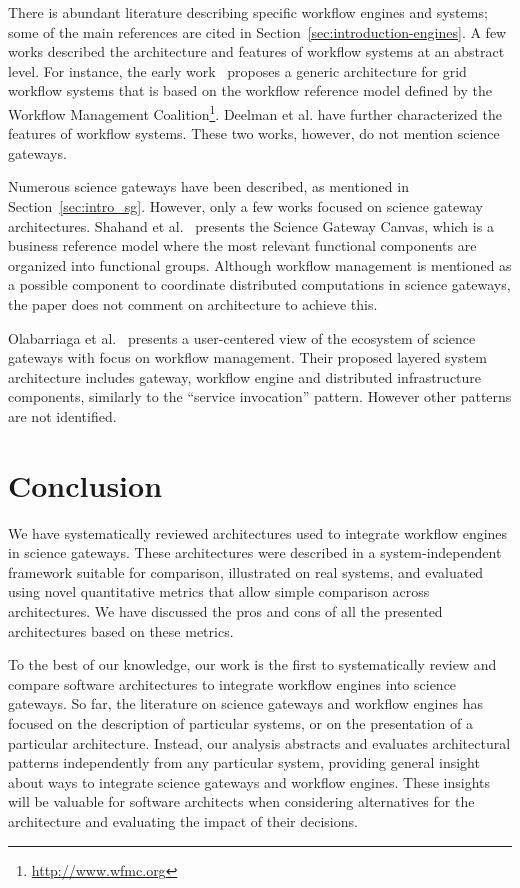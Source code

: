 \documentclass[preprint,3p,twocolumn]{elsarticle}
\begin{document}
There is abundant literature describing specific workflow engines and
systems; some of the main references are cited in
Section~\ref{sec:introduction-engines}. A few works described the
architecture and features of workflow systems at an abstract level. For
instance, the early work~\cite{yuTaxonomy} proposes a generic
architecture for grid workflow systems that is based on the workflow
reference model defined by the Workflow Management
Coalition\footnote{\url{http://www.wfmc.org}}.  Deelman et
al. \cite{deelman2009workflows} have further characterized the
features of workflow systems. These two works, however, do not mention
science gateways.

Numerous science gateways have been described, as mentioned in
Section~\ref{sec:intro_sg}. However, only a few works focused on
science gateway architectures. Shahand et al.~\cite{shahand:2015ab}
presents the Science Gateway Canvas, which is a business reference
model where the most relevant functional components are organized into
functional groups. Although workflow management is mentioned as a
possible component to coordinate distributed computations in science
gateways, the paper does not comment on architecture to achieve this.

Olabarriaga et al.~\cite{olabarriaga2014} presents a user-centered
view of the ecosystem of science gateways with focus on workflow
management. Their proposed layered system architecture includes
gateway, workflow engine and distributed infrastructure components,
similarly to the ``service invocation'' pattern. However other patterns
are not identified.

\section{Conclusion}

We have systematically reviewed architectures used to integrate
workflow engines in science gateways. These architectures were
described in a system-independent framework suitable for comparison,
illustrated on real systems, and evaluated using novel quantitative
metrics that allow simple comparison across architectures. We have
discussed the pros and cons of all the presented architectures based
on these metrics.

To the best of our knowledge, our work is the first to systematically
review and compare software architectures  to integrate workflow
engines into science gateways. So far, the literature on science gateways and
workflow engines has focused on the description of particular systems,
or on the presentation of a particular architecture.  Instead, our
analysis abstracts and evaluates architectural patterns independently
from any particular system, providing general insight about ways to integrate
science gateways and workflow engines. These insights will be valuable
for software architects when considering alternatives for the architecture and evaluating the impact of their decisions.
\end{document}
